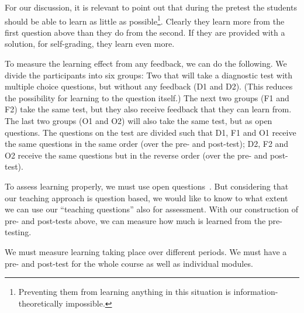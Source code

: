 For our discussion, it is relevant to point out that during the pretest the 
students should be able to learn as little as possible\footnote{%
  Preventing them from learning anything in this situation is 
  information-theoretically impossible.
}.
Clearly they learn more from the first question above than they do from the 
second.
If they are provided with a solution, \eg for self-grading, they learn even 
more.

To measure the learning effect from any feedback, we can do the following.
We divide the participants into six groups:
Two that will take a diagnostic test with multiple choice questions, but 
without any feedback (D1 and D2).
(This reduces the possibility for learning to the question itself.)
The next two groups (F1 and F2) take the same test, but they also receive 
feedback that they can learn from.
The last two groups (O1 and O2) will also take the same test, but as open 
questions.
The questions on the test are divided such that D1, F1 and O1 receive the same 
questions in the same order (over the pre- and post-test); D2, F2 and O2 
receive the same questions but in the reverse order (over the pre- and 
post-test).

To assess learning properly, we must use open 
questions~\parencite{NecessaryConditionsOfLearning}.
But considering that our teaching approach is question based, we would like to 
know to what extent we can use our \enquote{teaching questions} also for 
assessment.
With our construction of pre- and post-tests above, we can measure how much is 
learned from the pre-testing.

We must measure learning taking place over different periods.
We must have a pre- and post-test for the whole course as well as individual 
modules.

